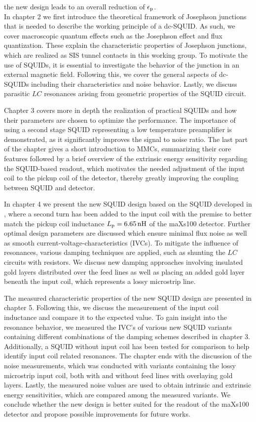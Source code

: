 the new design leads to an overall reduction of $\epsilon_{\rm p}$. \\

In chapter 2 we first introduce the theoretical framework of Josephson junctions that is needed to describe the working principle of a dc-SQUID. As such, we cover macroscopic quantum effects such as the Josephson effect and flux quantization. These explain the characteristic properties of Josephson junctions, which are realized as SIS tunnel contacts in this working group. To motivate the use of SQUIDs, it is essential to investigate the behavior of the junction in an external magnetic field. Following this, we cover the general aspects of dc-SQUIDs including their characteristics and noise behavior. Lastly, we discuss parasitic $LC$ resonances arising from geometric properties of the SQUID circuit.

Chapter 3 covers more in depth the realization of practical SQUIDs and how their parameters are chosen to optimize the performance. The importance of using a second stage SQUID representing a low temperature preamplifier is demonstrated, as it significantly improves the signal to noise ratio. The last part of the chapter gives a short introduction to MMCs, summarizing their core features followed by a brief overview of the extrinsic energy sensitivity regarding the SQUID-based readout, which motivates the needed adjustment of the input coil to the pickup coil of the detector, thereby greatly improving the coupling between SQUID and detector.   

In chapter 4 we present the new SQUID design based on the SQUID developed in \cite{Bauer2022}, where a second turn has been added to the input coil with the premise to better match the pickup coil inductance $L_{\rm p}=\qty{6.65}{\nH}$ of the maXs100 detector. Further optimal design parameters are discussed which ensure minimal flux noise as well as smooth current-voltage-characteristics (IVCs). To mitigate the influence of resonances, various damping techniques are applied, such as shunting the $LC$ circuits with resistors. We discuss new damping approaches involving insulated gold layers distributed over the feed lines as well as placing an added gold layer beneath the input coil, which represents a lossy microstrip line.  

The measured characteristic properties of the new SQUID design are presented in chapter 5. Following this, we discuss the measurement of the input coil inductance and compare it to the expected value. To gain insight into the resonance behavior, we measured the IVC's of various new SQUID variants containing different combinations of the damping schemes described in chapter 3. Additionally, a SQUID without input coil has been tested for comparison to help identify input coil related resonances. The chapter ends with the discussion of the noise measurements, which was conducted with variants containing the lossy microstrip input coil, both with and without feed lines with overlaying gold layers. Lastly, the measured noise values are used to obtain intrinsic and extrinsic energy sensitivities, which are compared among the measured variants. We conclude whether the new design is better suited for the readout of the maXs100 detector and propose possible improvements for future works.    